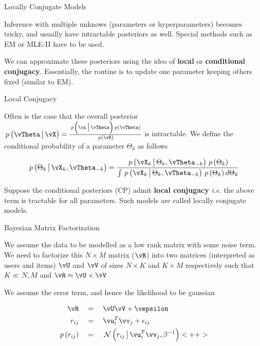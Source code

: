 \documentclass{article}
\begin{document}
\makeheader%

\begin{ssection}{Locally Conjugate Models}

	Inference with multiple unknows (parameters or hyperparameters) becomes tricky, and usually have intractable posteriors as well. Special methods such as EM or MLE-II have to be used. \br%

	We can approximate these posteriors using the ideo of \textbf{local} or \textbf{conditional conjugacy}. Essentially, the routine is to update one parameter keeping others fixed (similar to EM).

	\begin{ssubsection}{Local Conjugacy}

		Often is the case that the overall posterior $\prob{\vTheta \pipe \vX} = \frac{\prob{\vx \pipe \vTheta} \prob{\vTheta}}{\prob{\vX}}$ is intractable. We define the conditional probability of a parameter $\Theta_k$ as follows

		\begin{align*}
			\prob{\Theta_k \pipe \vX_k, \vTheta_{-k}} = \frac{\prob{\vX_k \pipe \Theta_k, \vTheta_{-k}} \prob{\Theta_k}}{\int \prob{\vX_k \pipe \Theta_k, \vTheta_{-k}} \prob{\Theta_k} d\Theta_k}
		\end{align*} \br%

		 \br%

		Suppose the conditional posteriors (CP) admit \textbf{local conjugacy} \textit{i.e.} the above term is tractable for all parameters. Such models are called locally conjugate models.
		
	\end{ssubsection}

	\begin{ssubsection}{Bayesian Matrix Factorization}

		We assume the data to be modelled as a low rank matrix with some noise term. We need to factorize this $N \times M$ matrix ($\vR$) into two matrices (interpreted as users and items) $\vU$ and $\vV$ of sizes $N \times K$ and $K \times M$ respectively such that $K \ll N, M$ and $\vR \approx \vU \times \vV$ \br%

		We assume the error term, and hence the likelihood to be gaussian

		\begin{align*}
			\vR			&\eq \vU \vV + \vepsilon \\
			r_{ij}		&\eq \vu_i^T \vv_j + \eps_{ij} \\
			\prob{r_{ij}}	&\eq \ND{r_{ij} \pipe \vu_i^T \vv_j, \beta^{-1}}<++>
		\end{align*} \br%


\end{ssubsection}
\end{ssection}
\end{document}
